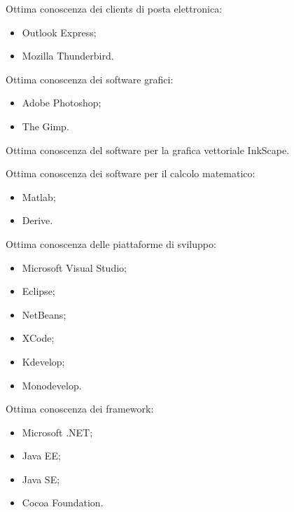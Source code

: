 \documentclass[totpages,helvetica,openbib,italian]{europecv}
\begin{document}
\begin{europecv}
{\begin{minipage}[t]{1\linewidth}
Ottima conoscenza dei clients di posta elettronica:
\begin{itemize}
\vspace{-3mm}\item[]Outlook Express;
\vspace{-3mm}\item[]Mozilla Thunderbird.
\end{itemize}

Ottima conoscenza dei software grafici:
\begin{itemize}
\vspace{-3mm}\item[] Adobe Photoshop;
\vspace{-3mm}\item[]The Gimp.

\end{itemize}

Ottima conoscenza del software per la grafica vettoriale InkScape.\\
\vspace{1mm}

Ottima conoscenza dei software per il calcolo matematico:
\begin{itemize}
\vspace{-3mm}\item[]Matlab;
\vspace{-3mm}\item[]Derive.
\end{itemize}


Ottima conoscenza delle piattaforme di sviluppo:
\begin{itemize}
\vspace{-3mm}\item[]Microsoft Visual Studio;
\vspace{-3mm}\item[]Eclipse;
\vspace{-3mm}\item[]NetBeans;
\vspace{-3mm}\item[]XCode;
\vspace{-3mm}\item[]Kdevelop;
\vspace{-3mm}\item[]Monodevelop.
\end{itemize}

Ottima conoscenza dei framework:
\begin{itemize}
\vspace{-3mm}\item[]Microsoft .NET;
\vspace{-3mm}\item[]Java EE;
\vspace{-3mm}\item[]Java SE;
\vspace{-3mm}\item[]Cocoa Foundation.
\end{itemize}


\end{minipage}}
\end{europecv}
\end{document}
